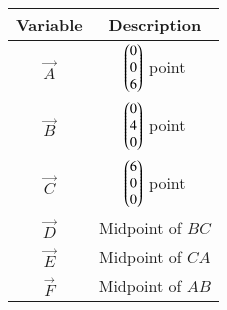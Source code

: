 \begin{tabular}[12pt]{ |c| c|}
    \hline
    \textbf{Variable} & \textbf{Description}\\ 
    \hline
	$\vec{A}$ & $\begin{pmatrix}0\\0\\6\end{pmatrix}$ point\\
    \hline
	$\vec{B}$ & $\begin{pmatrix}0\\4\\0\end{pmatrix}$ point\\
    \hline
	$\vec{C}$ & $\begin{pmatrix}6\\0\\0\end{pmatrix}$ point\\
	\hline
	$\vec{D}$ & Midpoint of $BC$\\
	\hline
	$\vec{E}$ & Midpoint of $CA$\\
    \hline
	$\vec{F}$ & Midpoint of $AB$\\
    \hline
    \end{tabular}
